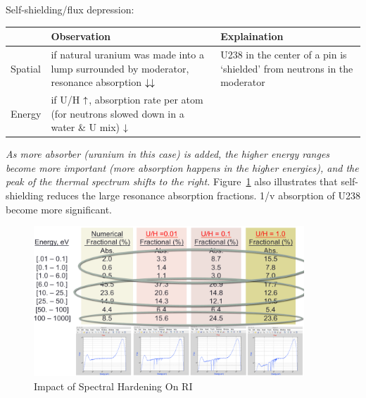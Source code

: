 \documentclass{school-22.211-notes}
\begin{document}
Self-shielding/flux depression: 
\begin{table}
  \centering
  \begin{tabular}{|l|p{6cm}|p{6cm}|} \hline
    & Observation & Explaination \\ \hline
    Spatial 
    & if natural uranium was made into a lump surrounded by moderator, resonance absorption $\downarrow \downarrow$  
    & U238 in the center of a pin is `shielded' from neutrons in the moderator \\ \hline
    Energy
    & if U/H $\uparrow$, absorption rate per atom (for neutrons slowed down in a water \& U mix) $\downarrow$   
    &  \\ \hline
  \end{tabular}
  \end{table}




\textit{As more absorber (uranium in this case) is added, the higher energy ranges become more important (more absorption happens in the higher energies), and the peak of the thermal spectrum shifts to the right.} Figure~\ref{spectral-hardening} also illustrates that self-shielding reduces the large resonance absorption fractions. 1/v absorption of U238 become more significant. 
\begin{figure}
  \centering
  \includegraphics[width=4in]{images/spectral-hardening.png}
  \caption{Impact of Spectral Hardening On RI} \label{spectral-hardening}
\end{figure}
\end{document}
